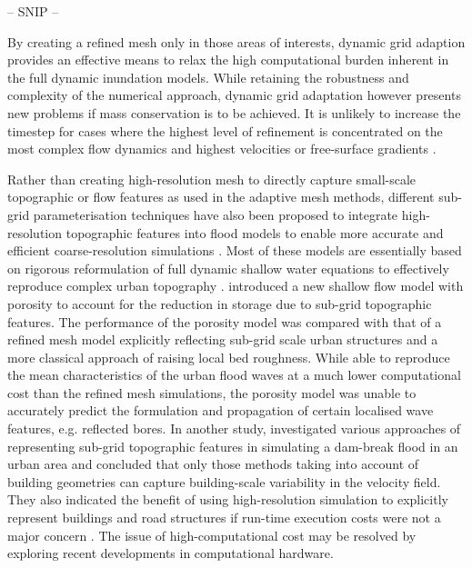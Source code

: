 -- SNIP --

By creating a refined mesh only in those areas of interests, dynamic grid adaption provides an effective means to relax the high computational burden inherent in the full dynamic inundation models. While retaining the robustness and complexity of the numerical approach, dynamic grid adaptation however presents new problems if mass conservation is to be achieved. It is unlikely to increase the timestep for cases where the highest level of refinement is concentrated on the most complex flow dynamics and highest velocities or free-surface gradients \citep[see descriptions of refinement criteria in][]{Liang2008a,Kubatko2009}.

Rather than creating high-resolution mesh to directly capture small-scale topographic or flow features as used in the adaptive mesh methods, different sub-grid parameterisation techniques have also been proposed to integrate high-resolution topographic features into flood models to enable more accurate and efficient coarse-resolution simulations \citep[e.g.][]{Soares-Frazao2008,Guinot2012,Schubert2012,Chen2012}. Most of these models are essentially based on rigorous reformulation of full dynamic shallow water equations to effectively reproduce complex urban topography \citep[e.g.][]{Soares-Frazao2008,Guinot2012,Schubert2012}. \citet{Soares-Frazao2008} introduced a new shallow flow model with porosity to account for the reduction in storage due to sub-grid topographic features. The performance of the porosity model was compared with that of a refined mesh model explicitly reflecting sub-grid scale urban structures and a more classical approach of raising local bed roughness. While able to reproduce the mean characteristics of the urban flood waves at a much lower computational cost than the refined mesh simulations, the porosity model was unable to accurately predict the formulation and propagation of certain localised wave features, e.g. reflected bores. In another study, \citet{Schubert2012} investigated various approaches of representing sub-grid topographic features in simulating a dam-break flood in an urban area and concluded that only those methods taking into account of building geometries can capture building-scale variability in the velocity field. They also indicated the benefit of using high-resolution simulation to explicitly represent buildings and road structures if run-time execution costs were not a major concern \citep[see also][]{Gallegos2009}. The issue of high-computational cost may be resolved by exploring recent developments in computational hardware.

